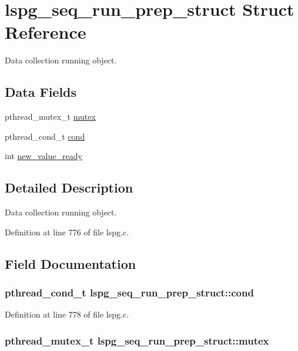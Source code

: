 \hypertarget{structlspg__seq__run__prep__struct}{
\section{lspg\_\-seq\_\-run\_\-prep\_\-struct Struct Reference}
\label{structlspg__seq__run__prep__struct}
}


Data collection running object.  
\subsection*{Data Fields}
\begin{DoxyCompactItemize}
\item 
pthread\_\-mutex\_\-t \hyperlink{structlspg__seq__run__prep__struct_ad146cb91b5f7dd8bb283092c28781fe7}{mutex}
\item 
pthread\_\-cond\_\-t \hyperlink{structlspg__seq__run__prep__struct_acd83ea6994f57377716ff01c8ee7ce43}{cond}
\item 
int \hyperlink{structlspg__seq__run__prep__struct_a42d08888327e9059ddd69ddfec31b8a9}{new\_\-value\_\-ready}
\end{DoxyCompactItemize}


\subsection{Detailed Description}
Data collection running object. 

Definition at line 776 of file lspg.c.

\subsection{Field Documentation}
\hypertarget{structlspg__seq__run__prep__struct_acd83ea6994f57377716ff01c8ee7ce43}{
\subsubsection[{cond}]{\setlength{\rightskip}{0pt plus 5cm}pthread\_\-cond\_\-t {\bf lspg\_\-seq\_\-run\_\-prep\_\-struct::cond}}}
\label{structlspg__seq__run__prep__struct_acd83ea6994f57377716ff01c8ee7ce43}


Definition at line 778 of file lspg.c.\hypertarget{structlspg__seq__run__prep__struct_ad146cb91b5f7dd8bb283092c28781fe7}{
\subsubsection[{mutex}]{\setlength{\rightskip}{0pt plus 5cm}pthread\_\-mutex\_\-t {\bf lspg\_\-seq\_\-run\_\-prep\_\-struct::mutex}}}
\label{structlspg__seq__run__prep__struct_ad146cb91b5f7dd8bb283092c28781fe7}



